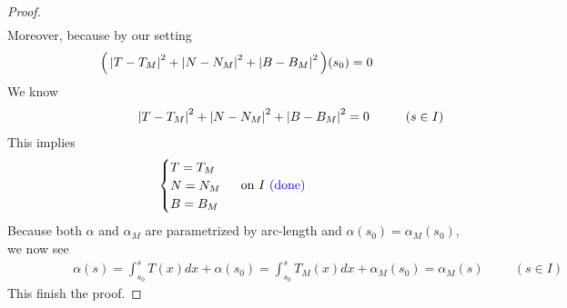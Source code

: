 \documentclass{report}
\begin{document}
\begin{proof}
\begin{align*}
\end{align*}
Moreover, because by our setting  
\begin{align*}
\Big( \left|T-T_M\right|^2+\left|N-N_M\right|^2+\left|B-B_M\right|^2\Big)(s_0)=0
\end{align*}
We know 
\begin{align*}
\hspace{3cm}\abso{T-T_M}^2+\abso{N-N_M}^2+\abso{B-B_M}^2=0\hspace{1cm}(s \in I)
\end{align*}
This implies 
\begin{align*}
\begin{cases}
  T=T_M\\
  N=N_M\\
  B=B_M
\end{cases}\text{ on $I\textcolor{blue}{\text{ (done) }}$ }
\end{align*}
Because both  $\alpha $ and $\alpha _M$ are parametrized by arc-length and $\alpha (s_0)=\alpha _M(s_0)$, we now see 
\begin{align*}
\hspace{2cm}\alpha (s)=\int_{s_0}^s T(x)dx+ \alpha (s_0)=\int_{s_0}^s T_M(x)dx+ \alpha_M(s_0)=\alpha_M(s)\hspace{1cm}(s \in I)
\end{align*}
This finish the proof. 
\end{proof}
\end{document}
